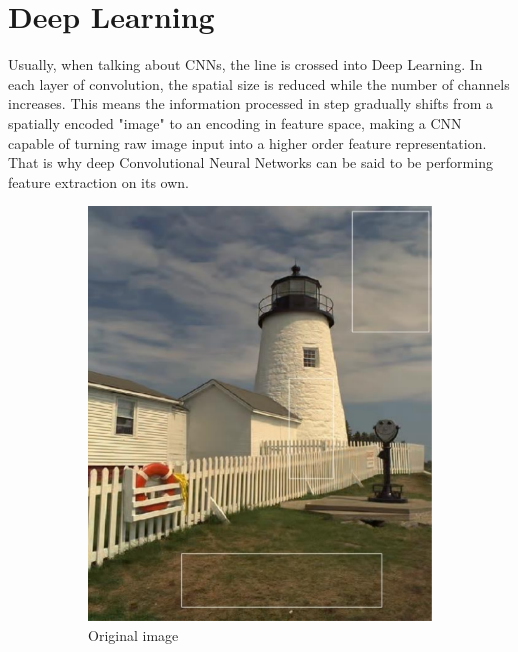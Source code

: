 \section{Deep Learning}
Usually, when talking about CNNs, the line is crossed into Deep Learning. In each layer of convolution, the spatial size is reduced while the number of channels increases. This means the information processed in step gradually shifts from a spatially encoded "image" to an encoding in feature space, making a CNN capable of turning raw image input into a higher order feature representation. That is why deep Convolutional Neural Networks can be said to be performing feature extraction on its own.

\begin{figure}
    \begin{subfigure}[h]{0.49\linewidth}
        \includegraphics[width=\linewidth]{Chapters/2.Background/figures/original.png}
        \caption{Original image}
    \end{subfigure}
    \hfill
    \begin{subfigure}[h]{0.49\linewidth}

\end{subfigure}
\end{figure}

